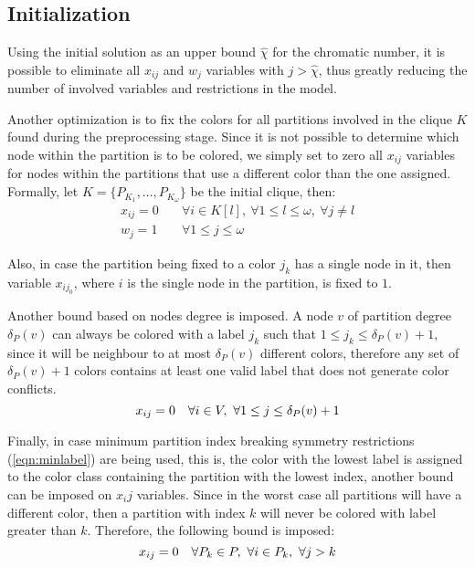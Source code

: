 \subsection{Initialization}

Using the initial solution as an upper bound $\hat{\chi}$ for the chromatic number, it is possible to eliminate all $x_{ij}$ and $w_j$ variables with $j > \hat{\chi}$, thus greatly reducing the number of involved variables and restrictions in the model.

Another optimization is to fix the colors for all partitions involved in the clique $K$ found during the preprocessing stage. Since it is not possible to determine which node within the partition is to be colored, we simply set to zero all $x_{ij}$ variables for nodes within the partitions that use a different color than the one assigned. Formally, let $K = \{ P_{K_1}, \ldots, P_{K_\omega} \}$ be the initial clique, then:
\begin{align*}
x_{ij} = 0 \quad &\forall i \in K[l],\ \forall 1 \leq l \leq \omega,\ \forall j \neq l \\
w_j = 1 \quad &\forall 1 \leq j \leq \omega
\end{align*}

Also, in case the partition being fixed to a color $j_k$ has a single node in it, then variable $x_{ij_0}$, where $i$ is the single node in the partition, is fixed to $1$.

Another bound based on nodes degree is imposed. A node $v$ of partition degree $\delta_P(v)$ can always be colored with a label $j_k$ such that $1 \leq j_k \leq \delta_P(v) + 1$, since it will be neighbour to at most $\delta_P(v)$ different colors, therefore any set of $\delta_P(v) + 1$ colors contains at least one valid label that does not generate color conflicts.  
\begin{equation*}
x_{ij} = 0 \quad \forall i \in V,\ \forall 1 \leq j \leq \delta_P(v) + 1 \\
\end{equation*}

Finally, in case minimum partition index breaking symmetry restrictions (\ref{eqn:minlabel}) are being used, this is, the color with the lowest label is assigned to the color class containing the partition with the lowest index, another bound can be imposed on $x_ij$ variables. Since in the worst case all partitions will have a different color, then a partition with index $k$ will never be colored with label greater than $k$. Therefore, the following bound is imposed:
\begin{equation*}
x_{ij} = 0 \quad \forall P_k \in P,\ \forall i \in P_k,\ \forall j > k \\
\end{equation*}


